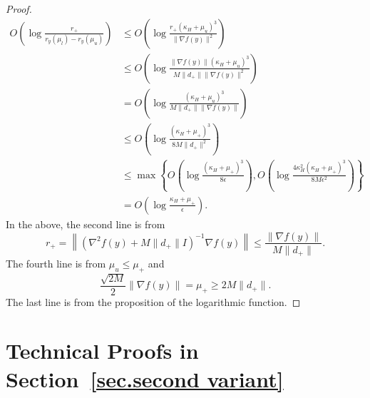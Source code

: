 \documentclass{mcom-l}
\numberwithin{equation}{section}
\begin{document}
\begin{proof}
    \begin{equation*}
        \begin{aligned}
            O\left(\log\frac{r_+}{r_y(\mu_l)-r_y(\mu_u)}\right) & \leq O\left(\log\frac{r_+(\kappa_H+\mu_u)^3}{\|\nabla f(y)\|^2}\right)                                                                                \\
                                                                & \leq O\left(\log\frac{\|\nabla f(y)\|(\kappa_H+\mu_u)^3}{M\|d_+\|\|\nabla f(y)\|^2}\right)                                                            \\
                                                                & = O\left(\log\frac{(\kappa_H+\mu_u)^3}{M\|d_+\|\|\nabla f(y)\|}\right)                                                                                \\
                                                                & \leq O\left(\log\frac{(\kappa_H+\mu_+)^3}{8M\|d_+\|^2}\right)                                                                                         \\
                                                                & \leq  \max \left\{O\left(\log\frac{(\kappa_H+\mu_+)^3}{8\epsilon}\right),O\left(\log\frac{4\kappa_H^2(\kappa_H+\mu_+)^3}{8M\epsilon^2}\right)\right\} \\
                                                                & = O\left(\log\frac{\kappa_H+\mu_+}{\epsilon}\right).
        \end{aligned}
    \end{equation*}
    In the above, the second line is from
    $$r_+ = \left\|\left(\nabla^2 f(y)+M\|d_+\|I\right)^{-1} \nabla f(y)\right\| \leq \frac{\|\nabla f(y)\|}{M\|d_+\|}.$$
    The fourth line is from $\mu_u \leq \mu_+$ and
    $$
        \frac{\sqrt{2M}}{2}\|\nabla f(y)\| =\mu_+ \geq 2M\|d_+\|.
    $$
    The last line is from the proposition of the logarithmic function.
\end{proof}

\section{Technical Proofs in Section~\ref{sec.second variant}}\label{sec.appendix 2}
\end{document}
